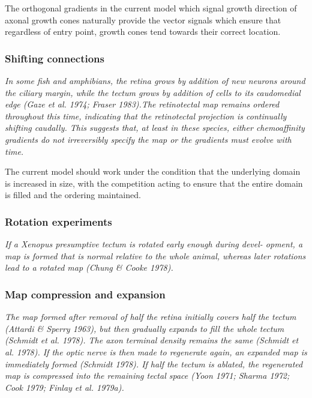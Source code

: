 \documentclass[11pt, a4paper]{article}
\begin{document}
The orthogonal gradients in the current model which signal growth direction of
axonal growth cones naturally provide the vector signals which ensure that
regardless of entry point, growth cones tend towards their correct location.

\subsubsection{Shifting connections}

\begin{displayquote}
\emph{In some fish and amphibians, the retina grows by addition of new neurons
around the ciliary margin, while the tectum grows by addition of cells to its
caudomedial edge (Gaze et al. 1974; Fraser 1983).The retinotectal map remains
ordered throughout this time, indicating that the retinotectal projection is
continually shifting caudally. This suggests that, at least in these species,
either chemoaffinity gradients do not irreversibly specify the map or the
gradients must evolve with time.}
\end{displayquote}

The current model should work under the condition that the underlying domain
is increased in size, with the competition acting to ensure that the entire
domain is filled and the ordering maintained.

\subsubsection{Rotation experiments}

\begin{displayquote}
\emph{If a Xenopus presumptive tectum is rotated early enough during devel- opment,
a map is formed that is normal relative to the whole animal, whereas later
rotations lead to a rotated map (Chung \& Cooke 1978).}
\end{displayquote}

\subsubsection{Map compression and expansion}

\begin{displayquote}
\emph{The map formed after removal of half the retina initially covers half the
tectum (Attardi \& Sperry 1963), but then gradually expands to fill the whole
tectum (Schmidt et al. 1978). The axon terminal density remains the same
(Schmidt et al.  1978). If the optic nerve is then made to regenerate again,
an expanded map is immediately formed (Schmidt 1978). If half the tectum is
ablated, the regenerated map is compressed into the remaining tectal space
(Yoon 1971; Sharma 1972; Cook 1979; Finlay et al. 1979a).}
\end{displayquote}
\end{document}
